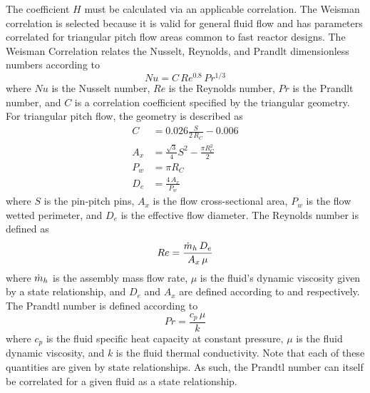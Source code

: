       The coefficient $H$ must be calculated via an applicable correlation.
      The Weisman correlation is selected because it is valid for general fluid
      flow and has parameters correlated for triangular pitch flow areas common
      to fast reactor designs. The Weisman Correlation relates the Nusselt,
      Reynolds, and Prandlt dimensionless numbers according to
      \begin{equation}
        \label{eq:weisman}
        Nu = C \, Re^{0.8} \, Pr^{1/3}
      \end{equation}
      where $Nu$ is the Nusselt number, $Re$ is the Reynolds number, $Pr$ is 
      the Prandlt number, and $C$ is a correlation coefficient specified by the
      triangular geometry. For triangular pitch flow, the geometry is described
      as
      \begin{align}
        \label{eq:weisman_c}
        C &= 0.026 \frac{S}{2 \, R_C} - 0.006 \\
        \label{eq:weisman_ax}
        A_x &= \frac{\sqrt{3}}{4} S^2 - \frac{\pi R_C^2}{2} \\
        \label{eq:weisman_pw}
        P_w &= \pi R_C \\
        \label{eq:weisman_de}
        D_e &= \frac{4 \, A_x}{P_w}
      \end{align}
      where $S$ is the pin-pitch pins, $A_x$ is the
      flow cross-sectional area, $P_w$ is the flow wetted perimeter, and $D_e$
      is the effective flow diameter. The Reynolds number is defined as
      \begin{equation}
        \label{eq:re}
        Re = \frac{\dot{m}_h \, D_e}{A_x \, \mu}
      \end{equation}
      where $\dot{m}_h$ is the assembly mass flow rate, $\mu$ is the fluid's
      dynamic viscosity given by a state relationship, and $D_e$ and $A_x$ are 
      defined according to  and 
      respectively. The Prandtl number is defined according to 
      \begin{equation}
        \label{eq:pr}
        Pr = \frac{c_p \, \mu}{k}
      \end{equation}
      where $c_p$ is the fluid specific heat capacity at constant pressure, 
      $\mu$ is the fluid dynamic viscosity, and $k$ is the fluid thermal 
      conductivity. Note that each of these quantities are given by state 
      relationships. As such, the Prandtl number can itself be correlated for a
      given fluid as a state relationship.
      
